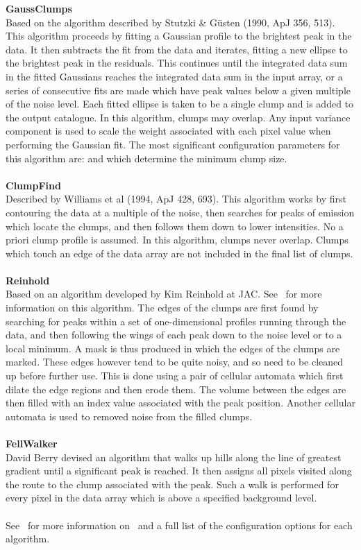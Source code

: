 \documentclass[11pt,oneside,chapters]{starlink}
\begin{document}
\textbf{GaussClumps}\\Based on the algorithm described by Stutzki \&
G\"{u}sten (1990, ApJ 356, 513). This algorithm proceeds by fitting a
Gaussian profile to the brightest peak in the data. It then subtracts
the fit from the data and iterates, fitting a new ellipse to the
brightest peak in the residuals. This continues until the integrated
data sum in the fitted Gaussians reaches the integrated data sum in
the input array, or a series of consecutive fits are made which have
peak values below a given multiple of the noise level. Each fitted
ellipse is taken to be a single clump and is added to the output
catalogue. In this algorithm, clumps may overlap. Any input variance
component is used to scale the weight associated with each pixel value
when performing the Gaussian fit. The most significant configuration
parameters for this algorithm are:  and
 which determine the minimum clump size.
\\\\
\textbf{ClumpFind}\\
Described by Williams et al (1994, ApJ 428, 693). This algorithm works
by first contouring the data at a multiple of the noise, then searches
for peaks of emission which locate the clumps, and then follows them
down to lower intensities. No a priori clump profile is assumed. In
this algorithm, clumps never overlap. Clumps which touch an edge of
the data array are not included in the final list of clumps.
\\\\
\textbf{Reinhold}\\
Based on an algorithm developed by Kim Reinhold at JAC. See
\cupidsun\ for more information on this algorithm. The edges of the
clumps  are first found by searching for peaks within a set of
one-dimensional profiles running through the data, and then following
the wings of each peak down to
the noise level or to a local minimum. A mask is thus produced in
which the edges of the clumps are marked. These edges however tend to
be quite noisy, and so need to be cleaned up before further use. This
is done using a pair of cellular automata which first dilate the edge
regions and then erode them. The volume between the edges are then
filled with an index value associated with the peak position. Another
cellular automata is used to removed noise from the filled clumps.
\\\\
\textbf{FellWalker}\\
David Berry devised an algorithm\cite{fellwalker} that walks up hills along the line
of greatest gradient until a significant peak is reached. It then
assigns all pixels visited along the route to the clump associated with the peak.
Such a walk is performed for every pixel in the data array which is
above a specified background level.
\\\\
See \cupidsun\ for more information on \findclumps\ and a full list of
the configuration options for each algorithm.
\end{document}
